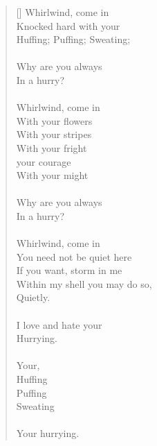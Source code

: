 \documentclass{article}
\begin{document}
\settowidth{\versewidth}{Than Tycho Brahe, or Erra Pater:}
\begin{verse}[\versewidth]
Whirlwind, come in \\
Knocked hard with your \\
Huffing; Puffing; Sweating; \\
\\
Why are you always \\
In a hurry? \\
\\
Whirlwind, come in \\
With your flowers \\
With your stripes \\
With your fright \\
\tab your courage \\
With your might \\
\\
Why are you always \\
In a hurry? \\
\\
Whirlwind, come in \\
You need not be quiet here \\
If you want, storm in me \\
Within my shell you may do so, \\
Quietly. \\
\\
I love and hate your \\
Hurrying. \\
\\
Your, \\
Huffing \\
Puffing \\
Sweating \\
\\
Your hurrying. \\
\end{verse}
\end{document}
